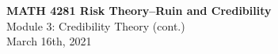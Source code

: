 \documentclass[11pt]{beamer}
\begin{document}
\begin{frame}
  \frametitle{}
  \begin{center}
    \textbf{\large MATH 4281 Risk Theory--Ruin and Credibility}\\
    \vspace{1cm}
    {\large  Module 3: Credibility Theory (cont.)} \\
    \vspace{1cm}
    {\large  March 16th, 2021}
    \end{center}
    \vspace{1cm}
\end{frame}
\begin{frame}
\tableofcontents
\end{frame}
\end{document}
